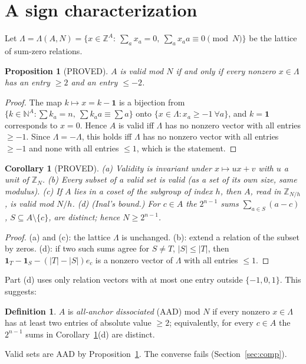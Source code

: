 \documentclass[11pt]{article}
\newtheorem{proposition}[theorem]{Proposition}
\newtheorem{corollary}[theorem]{Corollary}
\theoremstyle{definition}
\newtheorem{definition}[theorem]{Definition}
\newcommand{\Z}{\mathbb{Z}}
\newcommand{\N}{\mathbb{N}}
\newcommand{\ZN}{\Z_N}
\begin{document}
\section{A sign characterization}
Let $\Lambda=\Lambda(A,N)=\{x\in\Z^{A}:\ \sum_a x_a=0,\ \sum_a x_a a\equiv 0 \pmod N\}$ be the lattice of sum-zero relations.
\begin{proposition}[PROVED]\label{prop:sign}
$A$ is valid mod $N$ if and only if every nonzero $x\in\Lambda$ has an entry $\ge 2$ and an entry $\le -2$.
\end{proposition}
\begin{proof}
The map $k\mapsto x=k-\mathbf 1$ is a bijection from $\{k\in\N^A:\sum k_a=n,\ \sum k_a a\equiv\sum a\}$ onto $\{x\in\Lambda: x_a\ge -1\ \forall a\}$, and $k=\mathbf 1$ corresponds to $x=0$. Hence $A$ is valid iff $\Lambda$ has no nonzero vector with all entries $\ge -1$. Since $\Lambda=-\Lambda$, this holds iff $\Lambda$ has no nonzero vector with all entries $\ge -1$ and none with all entries $\le 1$, which is the statement.
\end{proof}
\begin{corollary}[PROVED]\label{cor:basic}
(a) Validity is invariant under $x\mapsto ux+v$ with $u$ a unit of $\ZN$. (b) Every subset of a valid set is valid (as a set of its own size, same modulus). (c) If $A$ lies in a coset of the subgroup of index $h$, then $A$, read in $\Z_{N/h}$, is valid mod $N/h$. (d) (Inal's bound.) For $c\in A$ the $2^{n-1}$ sums $\sum_{a\in S}(a-c)$, $S\subseteq A\setminus\{c\}$, are distinct; hence $N\ge 2^{n-1}$.
\end{corollary}
\begin{proof}
(a) and (c): the lattice $\Lambda$ is unchanged. (b): extend a relation of the subset by zeros. (d): if two such sums agree for $S\ne T$, $|S|\le |T|$, then $\mathbf 1_T-\mathbf 1_S-(|T|-|S|)e_c$ is a nonzero vector of $\Lambda$ with all entries $\le 1$.
\end{proof}
Part (d) uses only relation vectors with at most one entry outside $\{-1,0,1\}$. This suggests:
\begin{definition}
$A$ is \emph{all-anchor dissociated} (AAD) mod $N$ if every nonzero $x\in\Lambda$ has at least two entries of absolute value $\ge 2$; equivalently, for every $c\in A$ the $2^{n-1}$ sums in Corollary~\ref{cor:basic}(d) are distinct.
\end{definition}
Valid sets are AAD by Proposition~\ref{prop:sign}. The converse fails (Section~\ref{sec:comp}).
\end{document}
